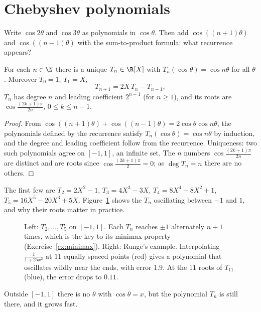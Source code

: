 \section{Chebyshev polynomials}

\begin{think}
Write $\cos2\theta$ and $\cos3\theta$ as polynomials in $\cos\theta$. Then add $\cos((n+1)\theta)$ and $\cos((n-1)\theta)$ with the sum-to-product formula: what recurrence appears?
\end{think}

\begin{proposition}\label{prop:cheb}
For each $n\in\N$ there is a unique $T_n\in\R[X]$ with $T_n(\cos\theta)=\cos n\theta$ for all $\theta$. Moreover $T_0=1$, $T_1=X$,
\[
T_{n+1}=2X\,T_n-T_{n-1},
\]
$T_n$ has degree $n$ and leading coefficient $2^{n-1}$ (for $n\ge1$), and its roots are $\cos\frac{(2k+1)\pi}{2n}$, $0\le k\le n-1$.
\end{proposition}
\begin{proof}
From $\cos((n+1)\theta)+\cos((n-1)\theta)=2\cos\theta\cos n\theta$, the polynomials defined by the recurrence satisfy
$T_n(\cos\theta)=\cos n\theta$ by induction, and the degree and leading coefficient follow from the recurrence. Uniqueness: two such polynomials agree on $[-1,1]$, an infinite set.
The $n$ numbers $\cos\frac{(2k+1)\pi}{2n}$ are distinct and are roots since $\cos\frac{(2k+1)\pi}2=0$; as $\deg T_n=n$ there are no others.
\end{proof}

The first few are $T_2=2X^2-1$, $T_3=4X^3-3X$, $T_4=8X^4-8X^2+1$, $T_5=16X^5-20X^3+5X$. Figure~\ref{fig:chebyshev} shows the $T_n$ oscillating between $-1$ and $1$, and why their roots matter in practice.

\begin{figure}[ht]
\centering
{}
\caption{Left: $T_2,\dots,T_5$ on $[-1,1]$. Each $T_n$ reaches $\pm1$ alternately $n+1$ times, which is the key to its minimax property (Exercise~\ref{ex:minimax}). Right: Runge's example. Interpolating $\frac1{1+25x^2}$ at $11$ equally spaced points (red) gives a polynomial that oscillates wildly near the ends, with error $1.9$. At the $11$ roots of $T_{11}$ (blue), the error drops to $0.11$.}
\label{fig:chebyshev}
\end{figure}

Outside $[-1,1]$ there is no $\theta$ with $\cos\theta=x$, but the polynomial $T_n$ is still there, and it grows fast.

